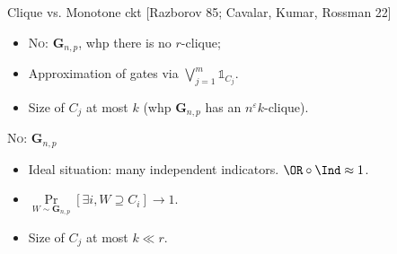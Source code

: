\begin{frame}{Clique vs. Monotone ckt [Razborov 85; Cavalar, Kumar, Rossman 22]}

    \begin{center}
                
    \end{center}


    \pause
    \begin{itemize}
        \item \textsc{No}: $\mathbf{G}_{n, p}$, whp there is no $r$-clique;
            \pause
        \item Approximation of gates via $\bigvee\limits_{j = 1}^{m} \mathds{1}_{C_j}$.
        \item Size of $C_j$ at most $k$ (whp $\mathbf{G}_{n, p}$ has an $n^{\varepsilon} k$-clique).
    \end{itemize}
\end{frame}


\begin{frame}{\textsc{No}: $\mathbf{G}_{n, p}$}

    \begin{center}
                
    \end{center}


    \pause
    \begin{itemize}
        \item Ideal situation: many independent indicators. \alert{$\OR \circ \Ind \approx 1$}.
            \pause
        \item $\Pr\limits_{W \sim \mathbf{G}_{n, p}}[\exists i, W \supseteq C_i] \to 1$.
        \item Size of $C_j$ at most $k \ll r$.
    \end{itemize}
\end{frame}

